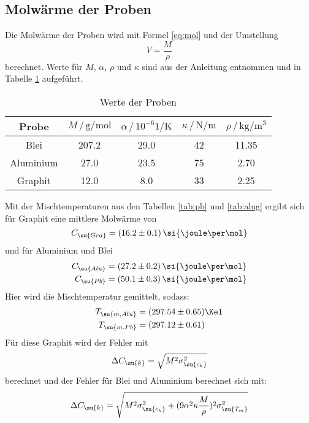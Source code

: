 \subsection{Molwärme der Proben}
Die Molwärme der Proben wird mit Formel \eqref{eq:mol} und der Umstellung
\begin{equation}
  V=\frac{M}{\rho}
\end{equation}
berechnet. Werte für $M$, $\alpha$, $\rho$ und $\kappa$ sind aus der Anleitung
\cite{201} entnommen und in Tabelle \ref{tab:mol} aufgeführt.
\begin{table}
  \centering
  \begin{tabular}{c | c c c c}
    \toprule
    Probe & $M\,/\,\si{\gram\per\mol}$&$\alpha\,/\,10^{-6}\si{1\per\kelvin}$
    &$\kappa\,/\,\si{\newton\per\meter}$&$\rho\,/\,\si{\kilo\gram\per\cubic
    \meter}$ \\
    \midrule
    Blei      & 207.2 & 29.0 & 42 & 11.35 \\
    Aluminium &  27.0 & 23.5 & 75 &  2.70 \\
    Graphit   &  12.0 &  8.0 & 33 &  2.25 \\
    \bottomrule
  \end{tabular}
  \caption{Werte der Proben}
  \label{tab:mol}
\end{table}
Mit der Mischtemperaturen aus den Tabellen \ref{tab:pb} und \ref{tab:alug}
ergibt sich für Graphit eine mittlere Molwärme von
\begin{equation*}
  C_\su{Gra}= (16.2\pm0.1)\,\si{\joule\per\mol}
\end{equation*}
und für Aluminium und Blei
\begin{align*}
  C_\su{Alu} &= (27.2\pm0.2)\,\si{\joule\per\mol} \\
  C_\su{Pb} &= (50.1\pm0.3)\,\si{\joule\per\mol}
\end{align*}
Hier wird die Mischtemperatur gemittelt, sodass:
\begin{align*}
  T_\su{m, Alu} &= (297.54\pm0.65)\Kel \\
  T_\su{m, Pb}  &= (297.12\pm0.61)
\end{align*}
Für diese Graphit wird der Fehler mit
\begin{equation*}
  \Delta C_\su{k}=\sqrt{M^2\sigma_\su{c_k}^2}
\end{equation*}
berechnet und der Fehler für Blei und Aluminium berechnet sich mit:
\begin{equation*}
  \Delta C_\su{k}=\sqrt{M^2\sigma_\su{c_k}^2+(9\alpha^2\kappa\frac{M}{\rho})^2
  \sigma_\su{T_m}^2}
\end{equation*}
